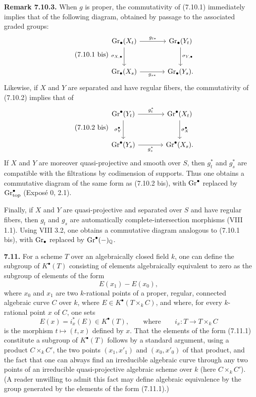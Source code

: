 \textbf{Remark 7.10.3.}
When $g$ is proper, the commutativity of (7.10.1) immediately implies that
of the following diagram, obtained by passage to the associated graded
groups:
\begin{equation}\tag{7.10.1 bis}
\begin{tikzcd}[column sep=large,row sep=large]
\Gr_\bullet(X_t) \arrow[r,"g_{t*}"]
  \arrow[d,"\sigma_{X,\bullet}"'] &
\Gr_\bullet(Y_t) \arrow[d,"\sigma_{Y,\bullet}"]\\
\Gr_\bullet(X_s) \arrow[r,"g_{s*}"'] & \Gr_\bullet(Y_s).
\end{tikzcd}
\end{equation}
Likewise, if $X$ and $Y$ are separated and have regular fibers, the
commutativity of (7.10.2) implies that of
\begin{equation}\tag{7.10.2 bis}
\begin{tikzcd}[column sep=large,row sep=large]
\Gr^\bullet(Y_t) \arrow[r,"g_t^*"] \arrow[d,"\sigma_Y^\bullet"'] &
\Gr^\bullet(X_t) \arrow[d,"\sigma_X^\bullet"]\\
\Gr^\bullet(Y_s) \arrow[r,"g_s^*"'] & \Gr^\bullet(X_s).
\end{tikzcd}
\end{equation}
If $X$ and $Y$ are moreover quasi-projective and smooth over $S$, then
$g_t^*$ and $g_s^*$ are compatible with the filtrations by codimension of
supports. Thus one obtains a commutative diagram of the same form as
(7.10.2 bis), with $\operatorname{Gr}^\bullet$ replaced by
$\operatorname{Gr}_{\mathrm{top}}^\bullet$ (Expos\'e 0, 2.1).

Finally, if $X$ and $Y$ are quasi-projective and separated over $S$ and have
regular fibers, then $g_t$ and $g_s$ are automatically complete-intersection
morphisms (VIII 1.1). Using VIII 3.2, one obtains a commutative diagram
analogous to (7.10.1 bis), with $\operatorname{Gr}_\bullet$ replaced by
$\operatorname{Gr}^\bullet(-)_{\mathbb Q}$.

\textbf{7.11.}
For a scheme $T$ over an algebraically closed field $k$, one can define the
subgroup of $K^\bullet(T)$ consisting of elements algebraically equivalent to
zero as the subgroup of elements of the form
\begin{equation}\tag{7.11.1}
E(x_1)-E(x_0),
\end{equation}
where $x_0$ and $x_1$ are two $k$-rational points of a proper, regular,
connected algebraic curve $C$ over $k$, where
$E\in K^\bullet(T\times_k C)$, and where, for every $k$-rational point $x$ of
$C$, one sets
\[
E(x)=i_x^*(E)\in K^\bullet(T),
\qquad\text{where}\qquad
i_x:T\longrightarrow T\times_k C
\]
is the morphism $t\mapsto(t,x)$ defined by $x$. That the elements of the form
(7.11.1) constitute a subgroup of $K^\bullet(T)$ follows by a standard
argument, using a product $C\times_k C'$, the two points
$(x_1,x'_1)$ and $(x_0,x'_0)$ of that product, and the fact that one can
always find an irreducible algebraic curve through any two points of an
irreducible quasi-projective algebraic scheme over $k$ (here
$C\times_k C'$). (A reader
unwilling to admit this fact may define algebraic equivalence by the group
generated by the elements of the form (7.11.1).)

